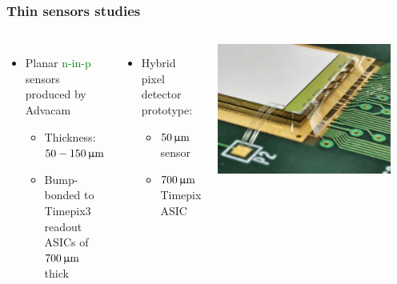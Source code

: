 \begin{frame}
  \frametitle{Thin sensors studies}

  \begin{columns}
    \begin{itemize}
    \item Planar \textcolor{Green}{n-in-p} sensors produced by Advacam
      \begin{itemize}
      \item Thickness: \textcolor{Green}{$50 - 150\,\upmu\mathrm{m}$}
      \item Bump-bonded to Timepix3 readout ASICs of
        \textcolor{Green}{$700\,\upmu\mathrm{m}$} thick
      \end{itemize}
    \end{itemize}

    \begin{itemize}
    \item Hybrid pixel detector prototype:
      \begin{itemize}
      \item $50\,\upmu\mathrm{m}$ sensor
      \item $700\,\upmu\mathrm{m}$ Timepix ASIC
      \end{itemize}
    \end{itemize}
    \centering
    \includegraphics[width=0.9\textwidth]{figures/Advacam-50um-assembly.jpeg}




\end{columns}
\end{frame}
